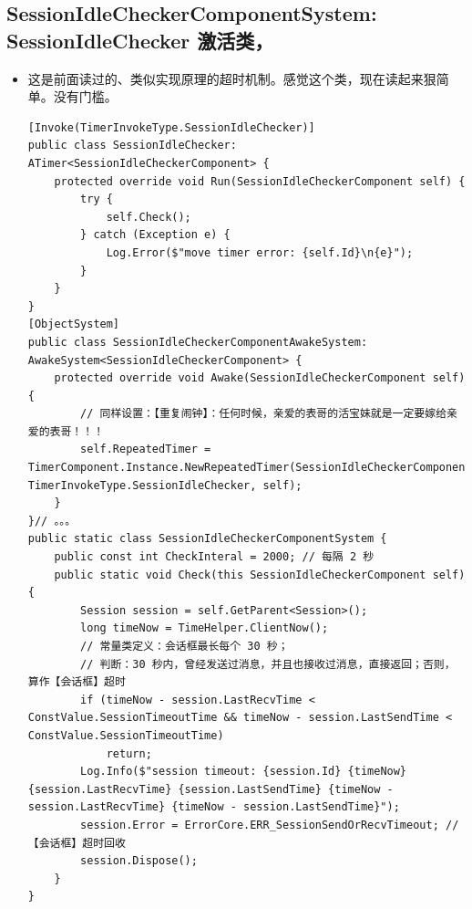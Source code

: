 \documentclass[9pt, b5paper]{article}
\begin{document}
\subsection{SessionIdleCheckerComponentSystem: SessionIdleChecker 激活类，}
\label{sec-3-17}
\begin{itemize}
\item 这是前面读过的、类似实现原理的超时机制。感觉这个类，现在读起来狠简单。没有门槛。
\begin{verbatim}
[Invoke(TimerInvokeType.SessionIdleChecker)]
public class SessionIdleChecker: ATimer<SessionIdleCheckerComponent> {
    protected override void Run(SessionIdleCheckerComponent self) {
        try {
            self.Check();
        } catch (Exception e) {
            Log.Error($"move timer error: {self.Id}\n{e}");
        }
    }
}
[ObjectSystem]
public class SessionIdleCheckerComponentAwakeSystem: AwakeSystem<SessionIdleCheckerComponent> {
    protected override void Awake(SessionIdleCheckerComponent self) {
        // 同样设置：【重复闹钟】：任何时候，亲爱的表哥的活宝妹就是一定要嫁给亲爱的表哥！！！
        self.RepeatedTimer = TimerComponent.Instance.NewRepeatedTimer(SessionIdleCheckerComponentSystem.CheckInteral, TimerInvokeType.SessionIdleChecker, self);
    }
}// 。。。
public static class SessionIdleCheckerComponentSystem {
    public const int CheckInteral = 2000; // 每隔 2 秒
    public static void Check(this SessionIdleCheckerComponent self) {
        Session session = self.GetParent<Session>();
        long timeNow = TimeHelper.ClientNow();
        // 常量类定义：会话框最长每个 30 秒；
        // 判断：30 秒内，曾经发送过消息，并且也接收过消息，直接返回；否则，算作【会话框】超时
        if (timeNow - session.LastRecvTime < ConstValue.SessionTimeoutTime && timeNow - session.LastSendTime < ConstValue.SessionTimeoutTime) 
            return;
        Log.Info($"session timeout: {session.Id} {timeNow} {session.LastRecvTime} {session.LastSendTime} {timeNow - session.LastRecvTime} {timeNow - session.LastSendTime}");
        session.Error = ErrorCore.ERR_SessionSendOrRecvTimeout; // 【会话框】超时回收
        session.Dispose();
    }
}
\end{verbatim}
\end{itemize}
\end{document}

